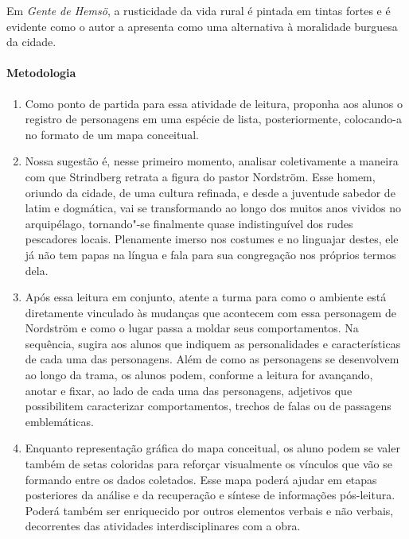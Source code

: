 \documentclass[12pt]{extarticle}
\begin{document}
Em \textit{Gente de Hemsö}, a rusticidade da vida rural é pintada em tintas
fortes e é evidente como o autor a apresenta como uma
alternativa à moralidade burguesa da cidade. 

\paragraph{Metodologia}

\begin{enumerate}

\item
Como ponto de partida para essa atividade de leitura, proponha aos alunos 
o registro de personagens em uma espécie de lista, posteriormente, colocando-a 
no formato de um mapa conceitual. 

\item
Nossa sugestão é, nesse primeiro momento, analisar coletivamente a maneira com 
que Strindberg retrata a figura do pastor Nordström. 
Esse homem, oriundo da cidade, de uma cultura refinada, e desde a juventude sabedor
de latim e dogmática, vai se transformando ao longo dos muitos anos vividos no arquipélago, 
tornando"-se finalmente quase indistinguível dos rudes pescadores locais. Plenamente
imerso nos costumes e no linguajar destes, ele já não tem papas na língua e fala para 
sua congregação nos próprios termos dela.

\item
Após essa leitura em conjunto, atente a turma para como o ambiente está diretamente 
vinculado às mudanças que acontecem com essa personagem de Nordström e como o lugar 
passa a moldar seus comportamentos. Na sequência, sugira aos alunos que indiquem as 
personalidades e características de cada uma das personagens. Além de como as personagens 
se desenvolvem ao longo da trama, os alunos podem, conforme a leitura for
avançando, anotar e fixar, ao lado de cada uma das personagens,
adjetivos que possibilitem caracterizar comportamentos, trechos de falas ou
de passagens emblemáticas. 

\item
Enquanto representação gráfica do mapa conceitual, os aluno podem se valer 
também de setas coloridas para reforçar visualmente os vínculos que vão se formando entre 
os dados coletados. Esse mapa poderá ajudar em etapas posteriores da análise e
da recuperação e síntese de informações pós-leitura. Poderá também ser
enriquecido por outros elementos verbais e não verbais, decorrentes das
atividades interdisciplinares com a obra.

\end{enumerate}
\end{document}
